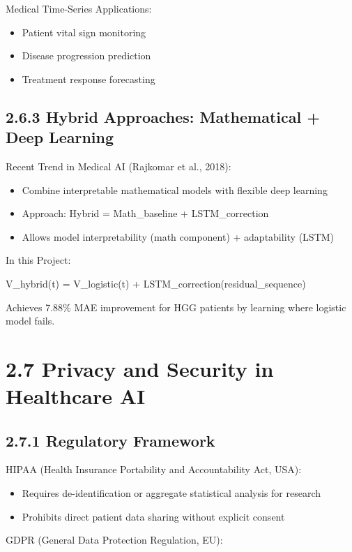 Medical Time-Series Applications:

\begin{itemize}
  \item Patient vital sign monitoring
  \item Disease progression prediction
  \item Treatment response forecasting
\end{itemize}


\subsection{2.6.3 Hybrid Approaches: Mathematical + Deep Learning}
Recent Trend in Medical AI (Rajkomar et al., 2018):

\begin{itemize}
  \item Combine interpretable mathematical models with flexible deep learning
  \item Approach: Hybrid = Math\_baseline + LSTM\_correction
  \item Allows model interpretability (math component) + adaptability (LSTM)
\end{itemize}

In this Project:

V\_hybrid(t) = V\_logistic(t) + LSTM\_correction(residual\_sequence)

Achieves 7.88\% MAE improvement for HGG patients by learning where logistic model fails.


\section{2.7 Privacy and Security in Healthcare AI}

\subsection{2.7.1 Regulatory Framework}
HIPAA (Health Insurance Portability and Accountability Act, USA):

\begin{itemize}
  \item Requires de-identification or aggregate statistical analysis for research
  \item Prohibits direct patient data sharing without explicit consent
\end{itemize}

GDPR (General Data Protection Regulation, EU):

